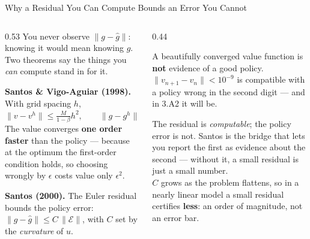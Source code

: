 \begin{frame}{Why a Residual You Can Compute Bounds an Error You Cannot}
\begin{columns}[T]
\begin{column}{0.53\textwidth}
\small
You never observe $\lVert g-\hat g\rVert$: knowing it would mean knowing $g$. Two theorems say the things you \emph{can} compute stand in for it.
\medskip

\textbf{Santos \& Vigo-Aguiar (1998).} With grid spacing $h$,
\[
  \lVert v-v^{h}\rVert\le \tfrac{M}{1-\beta}h^{2},
  \qquad
  \lVert g-g^{h}\rVert\le \big(\tfrac{M}{1-\beta}\big)^{1/2}h .
\]
The value converges \textbf{one order faster} than the policy --- because at the optimum the first-order condition holds, so choosing wrongly by $\epsilon$ costs value only $\epsilon^{2}$.
\medskip

\textbf{Santos (2000).} The Euler residual bounds the policy error:
$\lVert g-\hat g\rVert\le C\,\lVert\mathcal{E}\rVert$, with $C$ set by the \emph{curvature} of $u$.
\end{column}
\begin{column}{0.44\textwidth}
\begin{cautionbox}[title=\textbf{The consequence people miss}]\footnotesize
A beautifully converged value function is \textbf{not} evidence of a good policy. $\lVert v_{n+1}-v_n\rVert<10^{-9}$ is compatible with a policy wrong in the second digit --- and in 3.A2 it will be.
\end{cautionbox}
\medskip
\begin{takeawaybox}[title=\textbf{What this licenses}]\footnotesize
The residual is \emph{computable}; the policy error is not. Santos is the bridge that lets you report the first as evidence about the second --- without it, a small residual is just a small number.\\[1mm]
$C$ grows as the problem flattens, so in a nearly linear model a small residual certifies \textbf{less}: an order of magnitude, not an error bar.
\end{takeawaybox}
\end{column}
\end{columns}
\end{frame}

